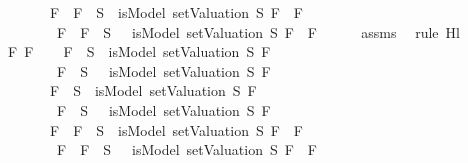 \begin{isabellebody}
\ \ \ \ \ \ \ {\isacharparenleft}F{}\ \isactrlbold {\isasymand}\ F{}\ {\isasymin}\ S\ {\isasymlongrightarrow}\ isModel\ {\isacharparenleft}setValuation\ S{\isacharparenright}\ {\isacharparenleft}F{}\ \isactrlbold {\isasymand}\ F{}{\isacharparenright}{\isacharparenright}\ {\isasymand}\isanewline
\ \ \ \ \ \ \ {\isacharparenleft}\isactrlbold {\isasymnot}\ {\isacharparenleft}F{}\ \isactrlbold {\isasymand}\ F{}{\isacharparenright}\ {\isasymin}\ S\ {\isasymlongrightarrow}\ {\isasymnot}\ isModel\ {\isacharparenleft}setValuation\ S{\isacharparenright}\ {\isacharparenleft}F{}\ \isactrlbold {\isasymand}\ F{}{\isacharparenright}{\isacharparenright}{\isachardoublequoteclose}\isanewline
\ \ \ \ \isamarkupfalse%
\ assms\ \isamarkupfalse%
\ {\isacharparenleft}rule\ Hl{}{\isacharunderscore}{}{\isacharparenright}\isanewline
{}\isamarkupfalse%
\isanewline
\ \ \isamarkupfalse%
\ F{}\ F{}\isanewline
\ \ \isamarkupfalse%
\ {\isachardoublequoteopen}{\isacharparenleft}F{}\ {\isasymin}\ S\ {\isasymlongrightarrow}\ isModel\ {\isacharparenleft}setValuation\ S{\isacharparenright}\ F{}{\isacharparenright}\ {\isasymand}\isanewline
\ \ \ \ \ \ \ {\isacharparenleft}\isactrlbold {\isasymnot}\ F{}\ {\isasymin}\ S\ {\isasymlongrightarrow}\ {\isasymnot}\ isModel\ {\isacharparenleft}setValuation\ S{\isacharparenright}\ F{}{\isacharparenright}\ {\isasymLongrightarrow}\isanewline
\ \ \ \ \ \ \ {\isacharparenleft}F{}\ {\isasymin}\ S\ {\isasymlongrightarrow}\ isModel\ {\isacharparenleft}setValuation\ S{\isacharparenright}\ F{}{\isacharparenright}\ {\isasymand}\isanewline
\ \ \ \ \ \ \ {\isacharparenleft}\isactrlbold {\isasymnot}\ F{}\ {\isasymin}\ S\ {\isasymlongrightarrow}\ {\isasymnot}\ isModel\ {\isacharparenleft}setValuation\ S{\isacharparenright}\ F{}{\isacharparenright}\ {\isasymLongrightarrow}\isanewline
\ \ \ \ \ \ \ {\isacharparenleft}F{}\ \isactrlbold {\isasymor}\ F{}\ {\isasymin}\ S\ {\isasymlongrightarrow}\ isModel\ {\isacharparenleft}setValuation\ S{\isacharparenright}\ {\isacharparenleft}F{}\ \isactrlbold {\isasymor}\ F{}{\isacharparenright}{\isacharparenright}\ {\isasymand}\isanewline
\ \ \ \ \ \ \ {\isacharparenleft}\isactrlbold {\isasymnot}\ {\isacharparenleft}F{}\ \isactrlbold {\isasymor}\ F{}{\isacharparenright}\ {\isasymin}\ S\ {\isasymlongrightarrow}\ {\isasymnot}\ isModel\ {\isacharparenleft}setValuation\ S{\isacharparenright}\ {\isacharparenleft}F{}\ \isactrlbold {\isasymor}\ F{}{\isacharparenright}{\isacharparenright}{\isachardoublequoteclose}\isanewline

\end{isabellebody}
